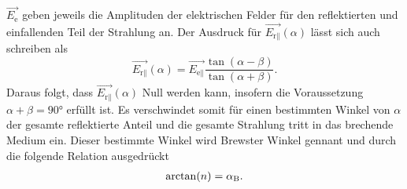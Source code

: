$\vec{E_{\text{e}}}$ geben jeweils die Amplituden der elektrischen Felder für den reflektierten und einfallenden Teil der Strahlung an.
\newline\newline
Der Ausdruck für $\vec{E_{\text{r}\parallel}}(\alpha)$ lässt sich auch schreiben als
\begin{equation}
    \vec{E_{\text{r}\parallel}}(\alpha) = \vec{E_{\text{e}\parallel}} \frac{\tan(\alpha - \beta)}{\tan(\alpha + \beta)}.
\end{equation}
Daraus folgt, dass $\vec{E_{\text{r}\parallel}}(\alpha)$ Null werden kann, insofern die Voraussetzung $\alpha + \beta = 90°$ erfüllt ist. Es verschwindet somit für einen bestimmten
Winkel von $\alpha$ der gesamte reflektierte Anteil und die gesamte Strahlung tritt in das brechende Medium ein. Dieser bestimmte Winkel wird Brewster Winkel gennant und durch die folgende Relation ausgedrückt
\begin{align}
    \arctan(n) = \alpha_{\text B}.
\end{align}